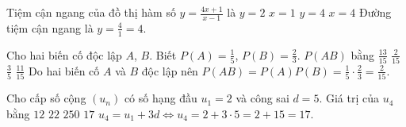 \begin{ex} %
	Tiệm cận ngang của đồ thị hàm số $\displaystyle y = \frac{4x+1}{x-1}$ là
	\choice
	{$y = 2$}
	{$x = 1$}
	{\True $y = 4$}
	{$x = 4$}
	\loigiai
	{
		Đường tiệm cận ngang là $\displaystyle y = \frac{4}{1} = 4$.
	}
\end{ex}

\begin{ex} %
	Cho hai biến cố độc lập $A$, $B$. Biết $\displaystyle P(A) = \frac{1}{5}$, $\displaystyle P(B) = \frac{2}{3}$. $P(AB)$ bằng
	\choice
	{$\displaystyle \frac{13}{15}$}
	{\True $\displaystyle \frac{2}{15}$}
	{$\displaystyle \frac{3}{5}$}
	{$\displaystyle \frac{11}{15}$}
	\loigiai
	{
		Do hai biến cố $A$ và $B$ độc lập nên $\displaystyle P(AB) = P(A)P(B) = \frac{1}{5} \cdot \frac{2}{3} = \frac{2}{15}$.
	}
\end{ex}

\begin{ex} %
	Cho cấp số cộng $(u_n)$ có số hạng đầu $u_1 = 2$ và công sai $d = 5$. Giá trị của $u_4$ bằng
	\choice
	{$12$}
	{$22$}
	{$250$}
	{\True $17$}
	\loigiai
	{
		$u_4 = u_1 + 3d \Leftrightarrow u_4 = 2 + 3 \cdot 5 = 2 + 15 = 17$.
	}
\end{ex}


